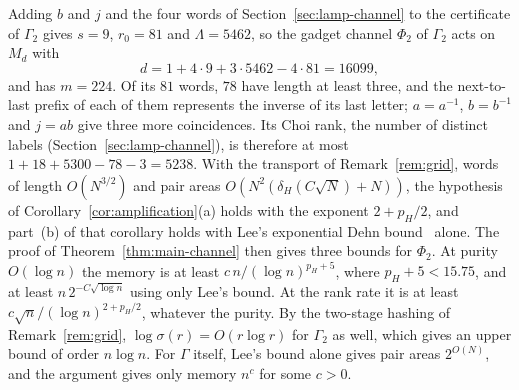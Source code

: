 \begin{remark}\label{rem:grid-channel}
Adding $b$ and $j$ and the four words of Section~\ref{sec:lamp-channel} to the certificate of $\Gamma_2$ gives $s=9$, $r_0=81$ and $\Lambda=5462$,
so the gadget channel $\Phi_2$ of $\Gamma_2$ acts on $M_d$ with
\[
d=1+4\cdot9+3\cdot5462-4\cdot81=16099,
\]
and has $m=224$. Of its $81$ words, $78$ have length at least three, and the next-to-last prefix of each of them represents
the inverse of its last letter; $a=a^{-1}$, $b=b^{-1}$ and $j=ab$ give three more coincidences. Its Choi rank, the number of
distinct labels (Section~\ref{sec:lamp-channel}), is therefore at most $1+18+5300-78-3=5238$. With the transport of Remark~\ref{rem:grid}, words of length $O(N^{3/2})$ and pair areas
$O(N^2(\delta_H(C\sqrt N)+N))$, the hypothesis of Corollary~\ref{cor:amplification}(a) holds with the exponent $2+p_H/2$, and part~(b) of that
corollary holds with Lee's exponential Dehn bound~\cite{Lee2012} alone. The proof of Theorem~\ref{thm:main-channel} then gives three bounds for
$\Phi_2$. At purity $O(\log n)$ the memory is at least $c\,n/(\log n)^{p_H+5}$, where $p_H+5<15.75$, and at least $n\,2^{-C\sqrt{\log n}}$ using
only Lee's bound. At the rank rate it is at least $c\sqrt n/(\log n)^{2+p_H/2}$, whatever the purity. By the two-stage hashing of
Remark~\ref{rem:grid}, $\log\sigma(r)=O(r\log r)$ for $\Gamma_2$ as well, which gives an upper bound of order $n\log n$. For $\Gamma$ itself,
Lee's bound alone gives pair areas $2^{O(N)}$, and the argument gives only memory $n^{c}$ for some $c>0$.
\end{remark}
